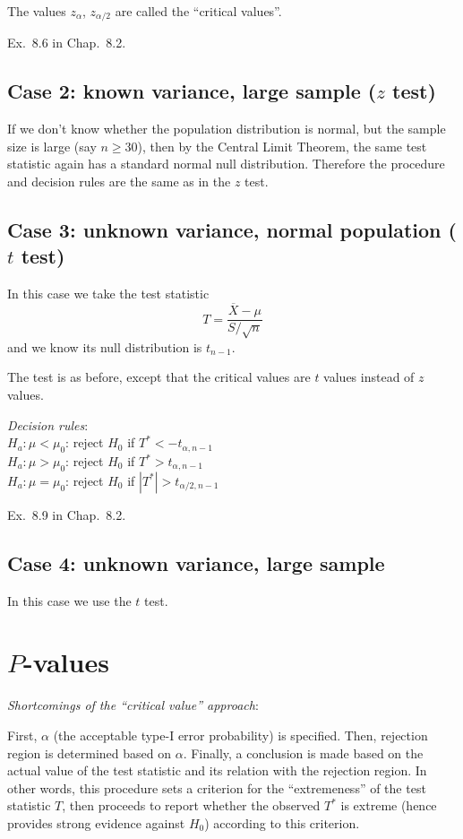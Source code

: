 \documentclass[12pt]{article}
\begin{document}
The values $z_{\alpha}$, $z_{\alpha/2}$ are called the ``critical
values''.

\example
Ex.~8.6 in Chap.~8.2.


\subsection{Case 2: known variance, large sample ($z$ test)}

If we don't know whether the population distribution is normal,
but the sample size is large (say $n \ge 30$),
then by the Central Limit Theorem,
the same test statistic again has a standard normal null distribution.
Therefore the procedure and decision rules are the same as in
the $z$ test.


\subsection{Case 3: unknown variance, normal population ($t$ test)}

In this case we take the test statistic
\[
T = \frac{\overline{X} - \mu}{S/\sqrt{n}}
\]
and we know its null distribution is $t_{n-1}$.

The test is as before, except that the critical values are
$t$ values instead of $z$ values.

\emph{Decision rules}:\\
$H_a: \mu < \mu_0$: reject $H_0$ if $T^* < -t_{\alpha, n-1}$\\
$H_a: \mu > \mu_0$: reject $H_0$ if $T^* > t_{\alpha, n-1}$\\
$H_a: \mu = \mu_0$: reject $H_0$ if $|T^*| > t_{\alpha/2, n-1}$

\example
Ex.~8.9 in Chap.~8.2.


\subsection{Case 4: unknown variance, large sample}

In this case we use the $t$ test.


\section{$P$-values}

\emph{Shortcomings of the ``critical value'' approach}:

First,
$\alpha$ (the acceptable type-I error probability) is specified.
Then, rejection region is determined based on $\alpha$.
Finally, a conclusion is made based on the actual value of the test
statistic and its relation with the rejection region.
In other words,
this procedure sets a criterion for the ``extremeness'' of the test
statistic $T$, then proceeds to report whether the observed $T^*$ is
extreme (hence provides strong evidence against $H_0$) according to this
criterion.
\end{document}
